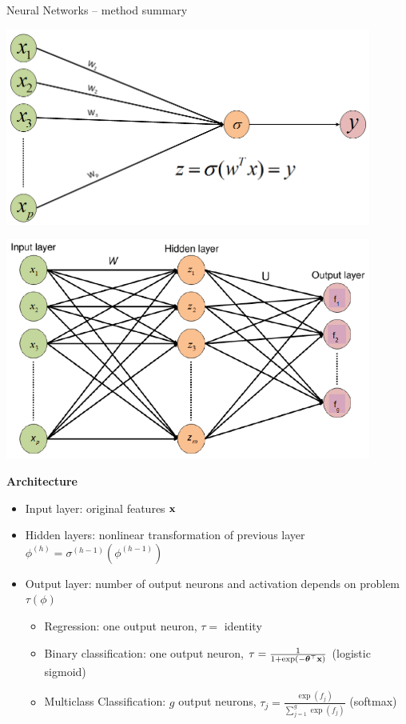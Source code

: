 \documentclass[11pt,compress,t,notes=noshow, xcolor=table]{beamer}
\newcommand{\highlight}[1]{\textcolor{hlcol}{\textbf{#1}}}
\begin{document}
\begin{vbframe}{Neural Networks -- method summary}
  \smallskip
  \begin{center}
  \begin{minipage}[b]{0.24\textwidth}
    \includegraphics[width=0.9\textwidth]{figure/nn-single-neuron} \\
  \end{minipage}%
  \begin{minipage}[b]{0.24\textwidth}
    \includegraphics[width=0.9\textwidth]{figure/nn-feedforward} \\
  \end{minipage}%
  \end{center}

  \framebreak

  \footnotesize

  \highlight{Architecture}
  
  \begin{itemize}
      \item Input layer: original features $\mathbf{x}$
      \item Hidden layers: nonlinear transformation of previous layer $\phi^{(h)} = \sigma^{(h - 1)}(\phi^{(h-1)})$
      \item Output layer: number of output neurons and activation depends on problem $\tau(\phi)$
      \begin{itemize}
      \item Regression: one output neuron, $\tau = $ identity
      \item Binary classification: one output neuron, $\tau = \frac{1}{1 + \exp(- \bm{\theta}^\top \mathbf{x})}$ (logistic sigmoid)
      \item Multiclass Classification: $g$ output neurons, $\tau_j = \frac{\exp(f_j)}{\sum_{j=1}^g \exp(f_j)}$ (softmax)
  \end{itemize}
  \end{itemize}
  

\end{vbframe}
\end{document}
